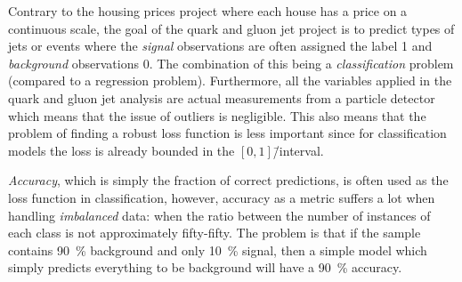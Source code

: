 Contrary to the housing prices project where each house has a price on a continuous scale, the goal of the quark and gluon jet project is to predict types of jets or events where the \emph{signal} observations are often assigned the label \num{1} and \emph{background} observations \num{0}. 
The combination of this being a \emph{classification} problem (compared to a regression problem). Furthermore, all the variables applied in the quark and gluon jet analysis are actual measurements from a particle detector which means that the issue of outliers is negligible.  This also means that the problem of finding a robust loss function is less important since for classification models the loss is already bounded in the $[0, 1]$\=/interval.

\emph{Accuracy}, which is simply the fraction of correct predictions, is often used as the loss function in classification, however, accuracy as a metric suffers a lot when handling \emph{imbalanced} data: when the ratio between the number of instances of each class is not approximately fifty-fifty. The problem is that if the sample contains \SI{90}{\percent} background and only \SI{10}{\percent} signal, then a simple model which simply predicts everything to be background will have a \SI{90}{\percent} accuracy.

